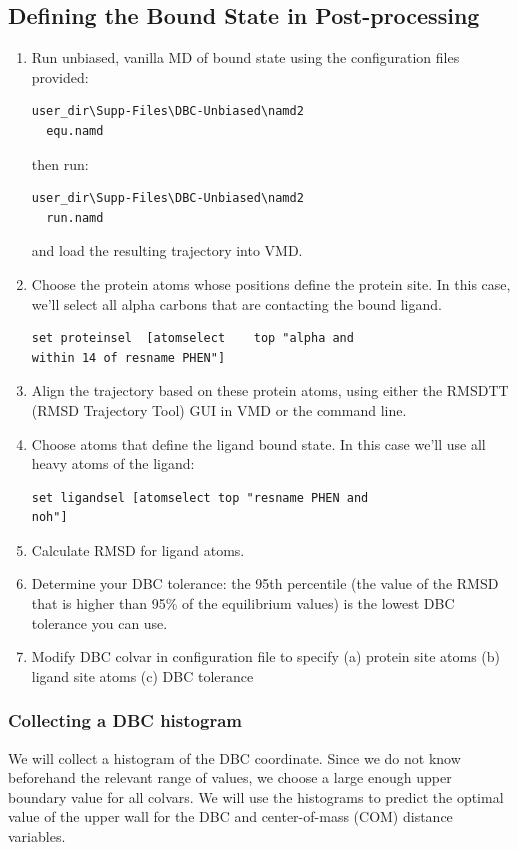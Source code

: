 \documentclass[9pt,tutorial]{livecoms}
\begin{document}
\subsection{Defining the Bound State in Post-processing}
\label{section 6.3}
\begin{enumerate}
\item Run unbiased, vanilla MD of bound state using the configuration files provided:
\begin{verbatim}
user_dir\Supp-Files\DBC-Unbiased\namd2
  equ.namd
\end{verbatim}
then run:
\begin{verbatim}
user_dir\Supp-Files\DBC-Unbiased\namd2
  run.namd
\end{verbatim}
and load the resulting trajectory into VMD. 
\item Choose the protein atoms whose positions define the protein site. In this case, we'll select all alpha carbons that are contacting the bound ligand.   
 \begin{verbatim}
set proteinsel  [atomselect    top "alpha and 
within 14 of resname PHEN"] 
\end{verbatim}
\item Align the trajectory based on these protein atoms, using either the RMSDTT (RMSD Trajectory Tool) GUI in VMD or the command line. 
\item Choose atoms that define the ligand bound state. In this case we'll use all heavy atoms of the ligand: 
\begin{verbatim}
set ligandsel [atomselect top "resname PHEN and
noh"]
\end{verbatim}
\item Calculate RMSD for ligand atoms.
\item Determine your DBC tolerance: the 95th percentile (the value of the RMSD that is higher than 95\% of the equilibrium values) is the lowest DBC tolerance you can use.    
\item Modify DBC colvar in configuration file to specify (a) protein site atoms (b) ligand site atoms (c) DBC tolerance
\end{enumerate}
\subsubsection{Collecting a DBC histogram}\label{section 6.3.1}

We will collect a histogram of the DBC coordinate.
Since we do not know beforehand the relevant range of values, we choose a large enough upper boundary value for all colvars.
We will use the histograms to predict the optimal value of the upper wall for the DBC and center-of-mass (COM) distance variables.
\end{document}
